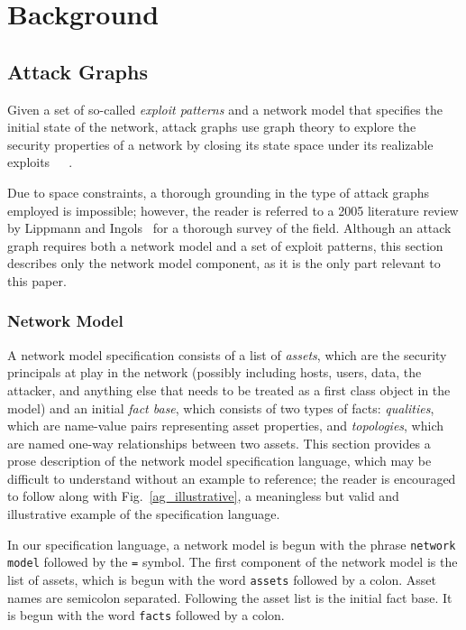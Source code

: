 \documentclass{article}
\begin{document}
\section{Background}
\subsection{Attack Graphs}
Given a set of so-called
\emph{exploit patterns} and a network model that specifies the initial state
of the network, attack graphs use graph theory to explore the security properties
of a network by closing its state space under its realizable 
exploits~\cite{campbell2002modeling}~\cite{phillips1998graph}~\cite{sheyner2002automated}.

Due to space constraints, a thorough grounding in the type of attack graphs
employed is impossible; however, the reader is referred to a 2005 literature
review by Lippmann and Ingols~\cite{lippmann2005annotated} for a thorough
survey of the field. Although an attack graph requires both a network model
and a set of exploit patterns, this section describes only the network model
component, as it is the only part relevant to this paper.
\subsubsection{Network Model}
A network model specification consists of a list of \emph{assets}, which are the
security principals at play in the network (possibly including hosts, users, 
data, the attacker, and anything else that needs to be treated as a first class
object in the model) and an initial \emph{fact
base}, which consists of two types of facts: \emph{qualities}, which are name-value pairs
representing asset properties, and \emph{topologies}, which are named
one-way relationships between two assets. This section provides a prose
description of the network model specification language, which may be difficult
to understand without an example to reference; the reader is encouraged to
follow along with Fig.~\ref{ag_illustrative}, a meaningless but valid and 
illustrative example of the specification language.

In our specification language, a network model is begun with the phrase 
\texttt{network model} followed by the
\texttt{=} symbol. The first component of the network model is the list of
assets, which is begun with the word \texttt{assets} followed by a colon. 
Asset names are
semicolon separated. Following the asset list is the initial fact base. It
is begun with the word \texttt{facts} followed by a colon.
\end{document}
